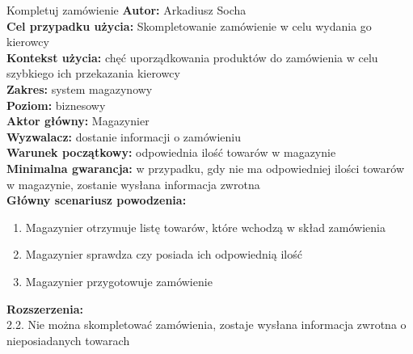 	\begin{usecase}{Kompletuj zamówienie}
		\textbf{Autor:} Arkadiusz Socha\\
		\textbf{Cel przypadku użycia:} Skompletowanie zamówienie w celu wydania go kierowcy \\
		\textbf{Kontekst użycia:} chęć uporządkowania produktów do zamówienia w celu szybkiego ich przekazania kierowcy \\
		\textbf{Zakres:} system magazynowy \\
		\textbf{Poziom:} biznesowy \\
		\textbf{Aktor główny:} Magazynier \\
		\textbf{Wyzwalacz:} dostanie informacji o zamówieniu \\
		\textbf{Warunek początkowy:} odpowiednia ilość towarów w magazynie \\
		\textbf{Minimalna gwarancja:} w przypadku, gdy nie ma odpowiedniej ilości towarów w magazynie, zostanie wysłana informacja zwrotna  \\
		\textbf{Główny scenariusz powodzenia:} 
			\begin{enumerate}
				\item Magazynier otrzymuje listę towarów, które wchodzą w skład zamówienia
				\item Magazynier sprawdza czy posiada ich odpowiednią ilość
				\item Magazynier przygotowuje zamówienie
			\end{enumerate}
		\textbf{Rozszerzenia:} \\
		2.2. Nie można skompletować zamówienia, zostaje wysłana informacja zwrotna o nieposiadanych towarach\\
	\end{usecase}

